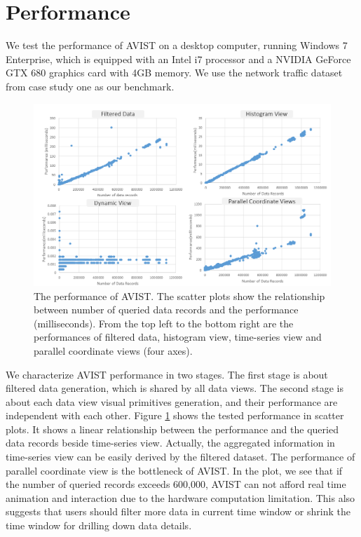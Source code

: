 \section{Performance}

We test the performance of AVIST on a desktop computer, running Windows 7 Enterprise, which is equipped with an Intel i7 processor and a NVIDIA GeForce GTX 680 graphics card with 4GB memory. We use the network traffic dataset from case study one as our benchmark.  

\begin{figure}[htb]
	\centering
	\includegraphics[width=1.0\linewidth]{pic/perf.png}
	\parbox[t]{1.0\columnwidth}{\relax
	}
	\caption{\label{fig:performance}
		The performance of AVIST. The scatter plots show the relationship between number of queried data records and the performance (milliseconds). From the top left to the bottom right are the performances of filtered data, histogram view, time-series view and parallel coordinate views (four axes).  }
\end{figure}

We characterize  AVIST performance in two stages. The first stage is about filtered data generation, which is shared by all data views. The second stage is about each data view visual primitives generation, and their performance are independent with each other. Figure \ref{fig:performance} shows the tested performance in scatter plots. 
It shows a linear relationship between the performance and the queried data records beside time-series view.
Actually, the aggregated information in time-series view can be easily derived by the filtered dataset. The performance of parallel coordinate view is the bottleneck of AVIST. In the plot, we see that if the number of queried records exceeds 600,000, AVIST can not afford real time animation and interaction due to the hardware computation limitation. This also suggests that  users should filter more data in current time window or shrink the time window  for drilling down data details.

